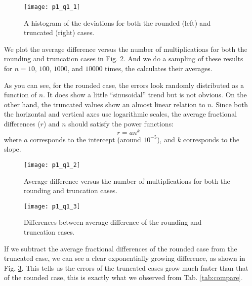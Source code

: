 \begin{figure}
    \centering
    \texttt{[image: p1\_q1\_1]}
    \caption{A histogram of the deviations for both the rounded (left) and
        truncated (right) cases.}
    \label{fig:histogram}
\end{figure}

We plot the average difference versus the number of multiplications for both the
rounding and truncation cases in Fig. \ref{fig:compare_rounding_truncation}.
And we do a sampling of these results for $n = 10$, $100$, $1000$, and $10000$ times,
the calculates their averages.

As you can see, for the rounded case, the errors look randomly distributed as a function
of $n$. It does show a little ``sinusoidal'' trend but is not obvious.
On the other hand, the truncated values show an almost linear relation to $n$.
Since both the horizontal and vertical axes use logarithmic scales, the average
fractional differences ($r$) and $n$ should satisfy the power functions:
%
\begin{equation}
    r = a n^k
\end{equation}
%
where $a$ corresponds to the intercept (around $10^{-5}$), and $k$ corresponds to the
slope.

\begin{figure}
    \centering
    \texttt{[image: p1\_q1\_2]}
    \caption{Average difference versus the number of multiplications for both
        the rounding and truncation cases.}
    \label{fig:compare_rounding_truncation}
\end{figure}

\begin{figure}
    \centering
    \texttt{[image: p1\_q1\_3]}
    \caption{Differences between average difference of the rounding and truncation cases.}
    \label{fig:diff_rounding_truncation}
\end{figure}

If we subtract the average fractional differences of the rounded case from the
truncated case, we can see a clear exponentially growing difference, as shown in
Fig. \ref{fig:diff_rounding_truncation}. This tells us the errors of the truncated
cases grow much faster than that of the rounded case, this is exactly what we observed
from Tab. \ref{tab:compare}.

\newpage
